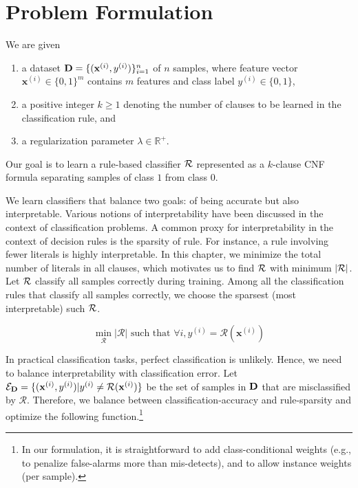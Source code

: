 

 \section{Problem Formulation}
 \label{interpretability_imli_sec:problem}
We are given 
\begin{enumerate}
	\item a dataset $ \mathbf{D} = \{(\mathbf{x}^{(i)}, y^{(i)})\}_{i=1}^n$ of $ n $ samples, where feature vector $ \mathbf{x}^{(i)} \in \{0, 1\}^m $ contains $ m $ features and class label $ y^{(i)} \in \{0,1\} $,
	\item a positive integer $ k \ge 1 $ denoting the number of clauses to be learned in the classification rule, and
	\item a regularization parameter $ \lambda \in \mathbb{R}^+ $.
\end{enumerate}
Our goal is to learn a rule-based classifier $ {\mathcal{R}} $ represented as a $ k $-clause CNF formula separating samples of class $ 1 $ from class $ 0 $. 
 
 

 We learn classifiers that balance two 
 goals: of  being accurate but also interpretable.  
 Various notions of interpretability have been discussed in the context of   classification problems. A common proxy for interpretability in the context of decision rules 
 is the sparsity of rule. For instance, a rule involving fewer literals is highly interpretable.  In this chapter, we minimize the total number of literals in all clauses, which motivates us to  find $ {\mathcal{R}}  $ with minimum  $ |{\mathcal{R}}| $. Let $ {\mathcal{R}} $ classify all samples correctly during training. Among all the classification rules that classify all samples correctly,  we choose the sparsest (most interpretable) such $ {\mathcal{R}} $. 
 
 

 \[
 \min\limits_{\mathcal{R}} |\mathcal{R}|\text{ such that }\forall i, y^{(i)}=\mathcal{R}(\mathbf{x}^{(i)})
 \]

 

 In practical classification tasks, perfect classification is unlikely. Hence, we need to balance interpretability with classification error.  Let $ \mathcal{E}_{\mathbf{D}} = \{(\mathbf{x}^{(i)},y^{(i)}) | y^{(i)} \ne \mathcal{R}(\mathbf{x}^{(i)}) \} $   be  the set of samples in $ \mathbf{D} $ that are misclassified  by $ \mathcal{R} $. Therefore, we balance between classification-accuracy and rule-sparsity and optimize the following function.\footnote{In our formulation, it is  straightforward to add class-conditional weights  (e.g., to penalize  false-alarms more than mis-detects), and to allow instance weights (per sample).}

